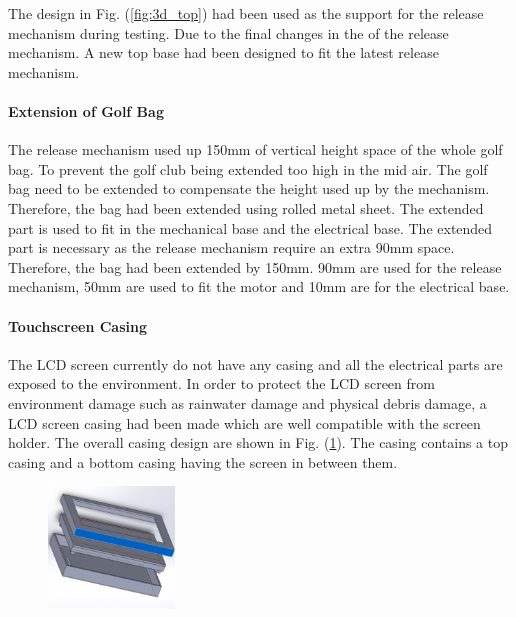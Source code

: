 \documentclass[11pt,landscape]{article}
\begin{document}
\begin{multicols}{3}
The design in Fig. (\ref{fig:3d_top}) had been used as the support for the release
mechanism during testing. Due to the final changes in the of the release
mechanism. A new top base had been designed to fit the latest release mechanism. 

\paragraph{Extension of Golf Bag}
The release mechanism used up 150mm of vertical height space of the whole golf
bag. To prevent the golf club being extended too high in the mid air. The golf
bag need to be extended to compensate the height used up by the mechanism.
Therefore, the bag had been extended using rolled metal sheet. The extended
part is used to fit in the mechanical base and the electrical base. The extended
part is necessary as the release mechanism require an extra 90mm space.
Therefore, the bag had been extended by 150mm. 90mm are used for the release
mechanism, 50mm are used to fit the motor and 10mm are for the electrical base. 

\paragraph{Touchscreen Casing}
The LCD screen currently do not have any casing and all the electrical parts are
exposed to the environment. In order to protect the LCD screen from environment
damage such as rainwater damage and physical debris damage, a LCD screen casing
had been made which are well compatible with the screen holder. The overall
casing design are shown in Fig. (\ref{fig:screen_casing}). The casing contains a top casing
and a bottom casing having the screen in between them.

\begin{figure}[H]
    \begin{center}
        \includegraphics[width=0.3\textwidth]{casing.png}
        \label{fig:screen_casing}
    \end{center}
\end{figure}


\end{multicols}
\end{document}
